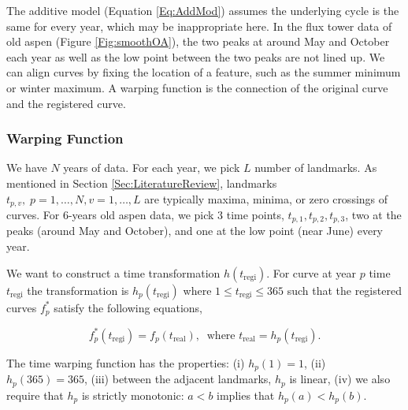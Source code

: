 \documentclass{article}
\begin{document}
The additive model (Equation \ref{Eq:AddMod}) assumes the underlying cycle is the same for every year, which may be inappropriate here.  In the flux tower data of old aspen (Figure \ref{Fig:smoothOA}), the two peaks at around May and October each year as well as the low point between the two peaks are not lined up.
We can align curves by fixing the location of a feature, such as the summer  minimum or winter maximum. 
A warping function is the connection of the original curve and the registered curve.

\subsubsection{Warping Function}\label{Sec:Warping}


We have $N$ years of data. For each year, we pick $L$ number of landmarks.
As mentioned in Section \ref{Sec:LiteratureReview}, landmarks $t_{p,v},\;p=1,\dots,N,v=1,\dots,L$  are typically maxima, minima, or zero crossings of curves. For 6-years old aspen data, we pick 3 time points, $t_{p,1},t_{p,2},t_{p,3}$,  two at the peaks (around May and October), and one at the low point (near June) every year.

We want to construct a time transformation $h(t_\textrm{regi})$. For curve at year $p$ time $t_\textrm{regi}$ the transformation is $h_p(t_\textrm{regi})$ where $1 \le t_\textrm{regi} \le 365$ such that the registered curves $f^{*}_p$ satisfy the following equations,

\begin{equation}\label{eq:warping}
f^{*}_p(t_{\textrm{regi}}) = f_p(t_{\textrm{real}}),\;\;\textrm{where }t_{\textrm{real}}=h_p(t_\textrm{regi}).
\end{equation}

The time warping function has the properties: (i) $h_p(1) = 1$, (ii) $h_p(365) = 365$, (iii) between the adjacent landmarks,  $h_p$ is linear, (iv) we also require that $h_p$ is strictly monotonic: $a < b$ implies that $h_p(a) < h_p(b)$.
\end{document}
